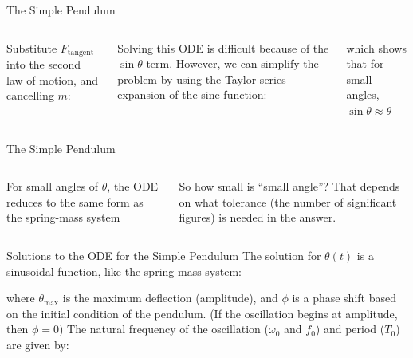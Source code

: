 \documentclass[12pt,compress,aspectratio=169]{beamer}
\begin{document}
\begin{frame}{The Simple Pendulum}
  \begin{columns}
    Substitute $F_\text{tangent}$ into the second law of motion, and cancelling
    $m$:


    \vspace{-.15in}Solving this ODE is difficult because of the $\sin\theta$
    term. However, we can simplify the problem by using the Taylor series
    expansion of the sine function:

    
    which shows that for small angles, $\sin\theta\approx\theta$
    
    \centering
    
    
  \end{columns}
\end{frame}



\begin{frame}{The Simple Pendulum}
  \begin{columns}
    For small angles of $\theta$, the ODE reduces to the same form as the
    spring-mass system


    So how small is ``small angle''? That depends on what tolerance (the
    number of significant figures) is needed in the answer.
    
    \centering
    

  \end{columns}
\end{frame}



\begin{frame}{Solutions to the ODE for the Simple Pendulum}
  The solution for $\theta(t)$ is a sinusoidal function, like the spring-mass
  system:


  where $\theta_\text{max}$ is the maximum deflection (amplitude), and $\phi$
  is a phase shift based on the initial condition of the pendulum. (If the
  oscillation begins at amplitude, then $\phi=0$) The natural frequency of
  the oscillation ($\omega_0$ and $f_0$) and period ($T_0$) are given by:
    
\end{frame}
\end{document}
